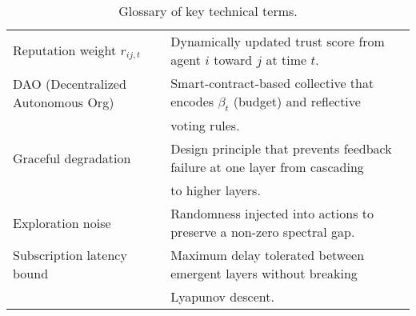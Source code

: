 \begin{table}[htbp!]
\begin{tabular}{@{}lp{}@{}}
Reputation weight $r_{ij,t}$ & Dynamically updated trust score from agent $i$ toward $j$ at time $t$. \\
DAO (Decentralized Autonomous Org) & Smart-contract-based collective that encodes $\beta_t$ (budget) and reflective \\
 & voting rules. \\
Graceful degradation & Design principle that prevents feedback failure at one layer from cascading \\
 & to higher layers. \\
Exploration noise & Randomness injected into actions to preserve a non-zero spectral gap. \\
Subscription latency bound & Maximum delay tolerated between emergent layers without breaking \\
 & Lyapunov descent. \\ \bottomrule
\end{tabular}
\caption{Glossary of key technical terms.}
\end{table}
